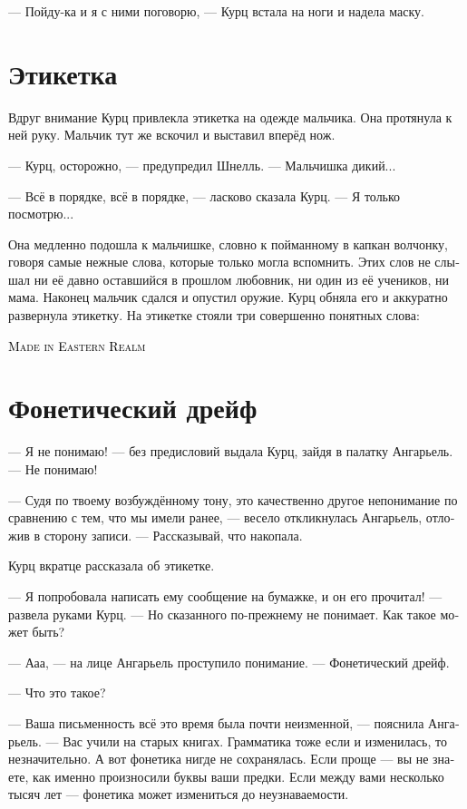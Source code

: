 \documentclass[a4paper,12pt,fleqn]{book}\usepackage{cooltooltips}\usepackage{polyglossia}\setdefaultlanguage[babelshorthands=true]{russian}\setotherlanguage{english}\defaultfontfeatures{Ligatures=TeX,Mapping=tex-text} \usepackage{xcolor}\definecolor{lightgray}{HTML}{bbbbbb}\color{lightgray}\newcommand{\ml}[3]{\textenglish{\textcolor{black}{#3}}}
\begin{document}
--- Пойду-ка и я с ними поговорю, --- Курц встала на ноги и надела маску.

\section{Этикетка}

Вдруг внимание Курц привлекла этикетка на одежде мальчика.
Она протянула к ней руку.
Мальчик тут же вскочил и выставил вперёд нож.

--- Курц, осторожно, --- предупредил Шнелль.
--- Мальчишка дикий...

--- Всё в порядке, всё в порядке, --- ласково сказала Курц.
--- Я только посмотрю...

Она медленно подошла к мальчишке, словно к пойманному в капкан волчонку, говоря самые нежные слова, которые только могла вспомнить.
Этих слов не слышал ни её давно оставшийся в прошлом любовник, ни один из её учеников, ни мама.
Наконец мальчик сдался и опустил оружие.
Курц обняла его и аккуратно развернула этикетку.
На этикетке стояли три совершенно понятных слова:

\ml{$0$}
{<<Сделано в Восточной Стране>>}
{\textsc{Made in Eastern Realm}}

\section{Фонетический дрейф}

--- Я не понимаю! --- без предисловий выдала Курц, зайдя в палатку Ангарьель.
--- Не понимаю!

--- Судя по твоему возбуждённому тону, это качественно другое непонимание по сравнению с тем, что мы имели ранее, --- весело откликнулась Ангарьель, отложив в сторону записи.
--- Рассказывай, что накопала.

Курц вкратце рассказала об этикетке.

--- Я попробовала написать ему сообщение на бумажке, и он его прочитал! --- развела руками Курц.
--- Но сказанного по-прежнему не понимает.
Как такое может быть?

--- Ааа, --- на лице Ангарьель проступило понимание.
--- Фонетический дрейф.

--- Что это такое?

--- Ваша письменность всё это время была почти неизменной, --- пояснила Ангарьель.
--- Вас учили на старых книгах.
Грамматика тоже если и изменилась, то незначительно.
А вот фонетика нигде не сохранялась.
Если проще --- вы не знаете, как именно произносили буквы ваши предки.
Если между вами несколько тысяч лет --- фонетика может измениться до неузнаваемости.
\end{document}
